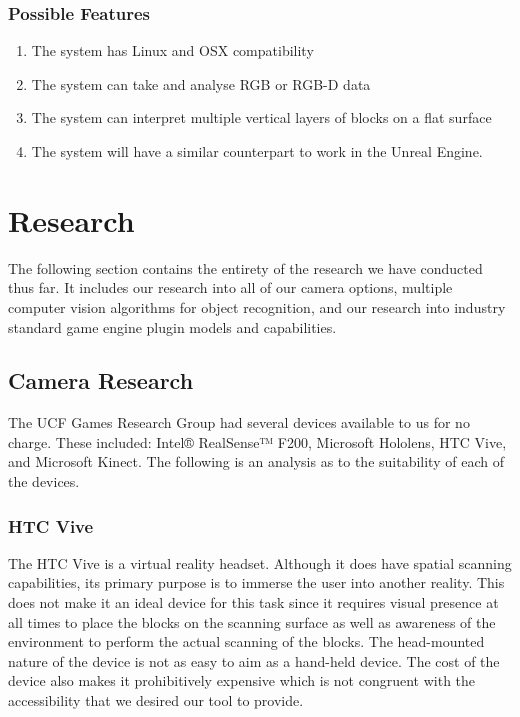 \documentclass[12pt]{article}
\providecommand{\tightlist}{%
  \setlength{\itemsep}{0pt}\setlength{\parskip}{0pt}}
\begin{document}
\subsubsection{Possible Features}\label{possible-features}

\begin{enumerate}
\def\labelenumi{\arabic{enumi}.}
\tightlist
\item
  The system has Linux and OSX compatibility
\item
  The system can take and analyse RGB or RGB-D data
\item
  The system can interpret multiple vertical layers of blocks on a flat
  surface
\item
  The system will have a similar counterpart to work in the Unreal
  Engine.
\end{enumerate}

\section{Research}\label{research}

The following section contains the entirety of the research we have
conducted thus far. It includes our research into all of our camera
options, multiple computer vision algorithms for object recognition, and
our research into industry standard game engine plugin models and
capabilities.

\subsection{Camera Research}\label{camera-research}

The UCF Games Research Group had several devices available to us for no
charge. These included: Intel® RealSense™ F200, Microsoft Hololens, HTC
Vive, and Microsoft Kinect. The following is an analysis as to the
suitability of each of the devices.

\subsubsection{HTC Vive}\label{htc-vive}

The HTC Vive is a virtual reality headset. Although it does have spatial
scanning capabilities, its primary purpose is to immerse the user into
another reality. This does not make it an ideal device for this task
since it requires visual presence at all times to place the blocks on
the scanning surface as well as awareness of the environment to perform
the actual scanning of the blocks. The head-mounted nature of the device
is not as easy to aim as a hand-held device. The cost of the device also
makes it prohibitively expensive which is not congruent with the
accessibility that we desired our tool to provide.
\end{document}
